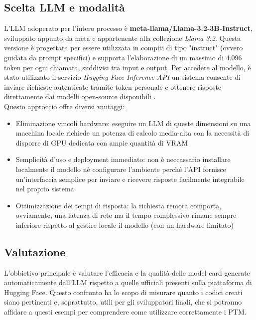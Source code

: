 \documentclass{article}
\begin{document}
\subsection{Scelta LLM e modalità} \label{scelta LLM}
L'LLM adoperato per l'intero processo è \textbf{meta-llama/Llama-3.2-3B-Instruct}, sviluppato appunto da meta e appartenente alla collezione \textit{Llama 3.2}. Questa versione è progettata per essere utilizzata in compiti di tipo "instruct" (ovvero guidata da prompt specifici) e supporta l’elaborazione di un massimo di 4.096 token per ogni chiamata, suddivisi tra input e output.  
Per accedere al modello, è stato utilizzato il servizio \textit{Hugging Face Inference API} un sistema consente di inviare richieste autenticate tramite token personale e ottenere risposte direttamente dai modelli open-source disponibili .\\
Questo approccio offre diversi vantaggi:
\begin{itemize}
    \item Eliminazione vincoli hardware: eseguire un LLM di queste dimensioni su una macchina locale richiede un potenza di calcolo media-alta con la necessità di disporre di GPU dedicata con ampie quantità di VRAM
    \item Semplicità d'uso e deployment immediato: non è neccassario installare localmente il modello nè configurare l'ambiente perché l'API fornisce un'interfaccia semplice per inviare e ricevere risposte facilmente integrabile nel proprio sistema
    \item Ottimizzazione dei tempi di risposta: la richiesta remota comporta, ovviamente, una latenza di rete ma il tempo complessivo rimane sempre inferiore rispetto al gestire locale il modello (con un hardware limitato)
\end{itemize}
\subsection{Valutazione}
L'obbietivo principale è valutare l'efficacia e la qualità delle model card generate automaticamente dall'LLM rispetto a quelle ufficiali presenti sulla piattaforma di Hugging Face.  Questo confronto ha lo scopo di misurare quanto i codici creati siano pertinenti e, soprattutto, utili per gli sviluppatori finali, che si potranno affidare a questi esempi per comprendere come utilizzare correttamente i PTM.
\end{document}
